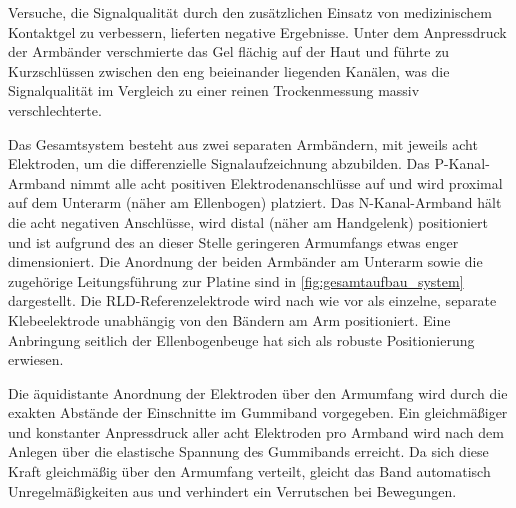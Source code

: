         Versuche, die Signalqualität durch den zusätzlichen Einsatz von medizinischem Kontaktgel zu verbessern, lieferten negative Ergebnisse. Unter dem Anpressdruck der Armbänder verschmierte das Gel flächig auf der Haut und führte zu Kurzschlüssen zwischen den eng beieinander liegenden Kanälen, was die Signalqualität im Vergleich zu einer reinen Trockenmessung massiv verschlechterte.

        Das Gesamtsystem besteht aus zwei separaten Armbändern, mit jeweils acht Elektroden, um die differenzielle Signalaufzeichnung abzubilden. Das P-Kanal-Armband nimmt alle acht positiven Elektrodenanschlüsse auf und wird proximal auf dem Unterarm (näher am Ellenbogen) platziert. Das N-Kanal-Armband hält die acht negativen Anschlüsse, wird distal (näher am Handgelenk) positioniert und ist aufgrund des an dieser Stelle geringeren Armumfangs etwas enger dimensioniert. Die Anordnung der beiden Armbänder am Unterarm sowie die zugehörige Leitungsführung zur Platine sind in \autoref{fig:gesamtaufbau_system} dargestellt. Die \ac{RLD}-Referenzelektrode wird nach wie vor als einzelne, separate Klebeelektrode unabhängig von den Bändern am Arm positioniert. Eine Anbringung seitlich der Ellenbogenbeuge hat sich als robuste Positionierung erwiesen.

        Die äquidistante Anordnung der Elektroden über den Armumfang wird durch die exakten Abstände der Einschnitte im Gummiband vorgegeben. Ein gleichmäßiger und konstanter Anpressdruck aller acht Elektroden pro Armband wird nach dem Anlegen über die elastische Spannung des Gummibands erreicht. Da sich diese Kraft gleichmäßig über den Armumfang verteilt, gleicht das Band automatisch Unregelmäßigkeiten aus und verhindert ein Verrutschen bei Bewegungen. 
